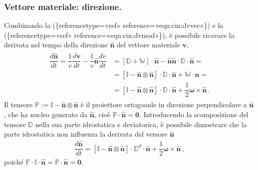 \documentclass[letterpaper,10pt,italian]{jupyterBook}
\begin{document}
\subsubsection{Vettore materiale: direzione.}
\label{\detokenize{polimi/fluidmechanics-ita/template/capitoli/03_cinematica/12teoria:vettore-materiale-direzione}}
\sphinxAtStartPar
Combinando la (\{reference\sphinxhyphen{}type=»ref»
reference=»eqn:cin:dvvec»\}) e la
(\{reference\sphinxhyphen{}type=»ref»
reference=»eqn:cin:dvmod»\}), è possibile ricavare la derivata nel tempo
della direzione \(\mathbf{\hat{n}}\) del vettore materiale \(\mathbf{v}\),
\begin{equation*}
\begin{split}\begin{aligned}
 \dfrac{d \mathbf{\hat{n}}}{d t} = \dfrac{1}{v}\dfrac{d\mathbf{v}}{dt} - \dfrac{1}{v} \mathbf{\hat{n}} \dfrac{d v}{d t}  & = [ \mathbb{D} + \mathbb{W} ] \cdot \mathbf{\hat{n}} - \mathbf{\hat{n}} \mathbf{\hat{n}} \cdot \mathbb{D} \cdot \mathbf{\hat{n}} = \\
   & =  [ \mathbb{I} - \mathbf{\hat{n}} \otimes \mathbf{\hat{n}} ] \cdot \mathbb{D} \cdot \mathbf{\hat{n}} + \mathbb{W} \cdot \mathbf{\hat{n}} = \\
   & = [ \mathbb{I} - \mathbf{\hat{n}} \otimes \mathbf{\hat{n}} ] \cdot \mathbb{D} \cdot \mathbf{\hat{n}} + \dfrac{1}{2} \mathbf{\omega} \times \mathbf{\hat{n}} \ .
\end{aligned}\end{split}
\end{equation*}
\sphinxAtStartPar
Il tensore
\(\mathbb{P} := \mathbb{I} - \mathbf{\hat{n}} \otimes \mathbf{\hat{n}}\) è il
proiettore ortogoanle in direzione perpendicolare a \(\mathbf{\hat{n}}\), che
ha nucleo generato da \(\mathbf{\hat{n}}\), cioè
\(\mathbb{P} \cdot \mathbf{\hat{n}} = \mathbf{0}\). Introducendo la scomposizione
del tensore \(\mathbb{D}\) nella sua parte idrostatica e deviatorica, è
possibile dimostrare che la parte idrostatica non influenza la derivata
del versore \(\mathbf{\hat{n}}\)
\begin{equation*}
\begin{split}\dfrac{d \mathbf{\hat{n}}}{d t} = [ \mathbb{I} - \mathbf{\hat{n}} \otimes \mathbf{\hat{n}} ] \cdot \mathbb{D}^d \cdot \mathbf{\hat{n}} + \dfrac{1}{2} \mathbf{\omega} \times \mathbf{\hat{n}} \ ,\end{split}
\end{equation*}
\sphinxAtStartPar
poiché
\(\mathbb{P} \cdot \mathbb{I} \cdot \mathbf{\hat{n}} = \mathbb{P} \cdot \mathbf{\hat{n}} = \mathbf{0}\).
\end{document}
